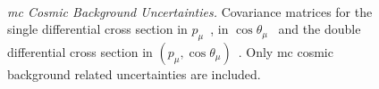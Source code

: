 \begin{figure}[]
\centering
{} 
 \\
 \quad
\caption[\acrshort{mc} Cosmic Background Uncertainties - Covariance Matrices]{\emph{\acrshort{mc} Cosmic Background Uncertainties.} 
Covariance matrices for the single differential cross section in $p_\mu$~\protect{}, in $\cos\theta_\mu$~\protect{} and the double differential cross section in $(p_\mu, \cos\theta_\mu)$~\protect{}. 
Only \acrshort{mc} cosmic background related uncertainties are included.
}
\label{fig:overlay_multisim_mumom}
\end{figure}


